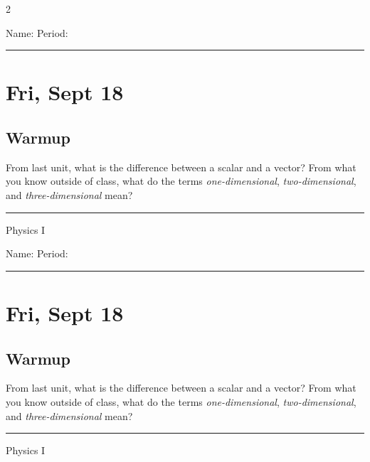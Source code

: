 \documentclass[10pt,landscape]{exam}
\def\todayDate{Fri, Sept 18}
\def\content{
\begin{questions}
  \question
    From last unit, what is the difference between a scalar and a vector? \vs
  \question
    From what you know outside of class, what do the terms \emph{one-dimensional}, \emph{two-dimensional}, and \emph{three-dimensional} mean? \vs[2]
\end{questions}
}
\begin{document}
\pagestyle{empty}

\setlength{\columnsep}{0.8in}
\begin{multicols*}{2}

\noindent  
Name: \hfill Period: \hspace{5em}
\vspace{0.5em}
\hrule

\section*{\todayDate}
\subsection*{Warmup}

\content

\vfill
\hrule
\vspace{0.5em}
\hfill {\sc Physics I}

\columnbreak

\noindent  
Name: \hfill Period: \hspace{5em}
\vspace{0.5em}
\hrule

\section*{\todayDate}
\subsection*{Warmup}

\content

\vfill
\hrule
\vspace{0.5em}
\hfill {\sc Physics I}

\end{multicols*}
\end{document}
